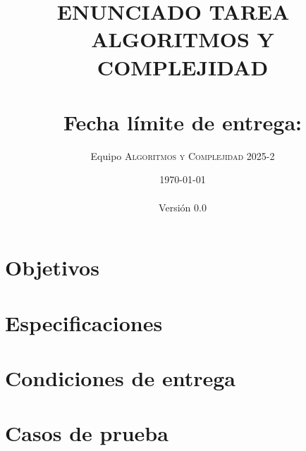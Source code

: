 \documentclass[10pt,spanish]{article} %
\title{
  \huge
  \textbf{ENUNCIADO TAREA \tnum~ \\ ALGORITMOS Y COMPLEJIDAD} \\[1ex]
  \emph{\textquote{[TODO: Añadir titulo]}} \\[1ex]
  {\normalsize Fecha límite de entrega: \tcm{\deadline}}\\
  }
\author{
  Equipo \textsc{Algoritmos y Complejidad} 2025-2
}
\date{
  \small
  \today\\
  \currenttime\\
  Versión 0.0
}
\begin{document}
\maketitle
\thispagestyle{fancy} %
\vspace{-1.0\baselineskip}

\setlength{\epigraphwidth}{0.7\textwidth}



\setcounter{tocdepth}{2}
\tableofcontents

\newpage
\section{Objetivos}


\newpage
\section{Especificaciones}



\newpage
\section{Condiciones de entrega}


\newpage
\appendix

\section{Casos de prueba}\label{sec:test_cases}



\printbibliography
\end{document}
